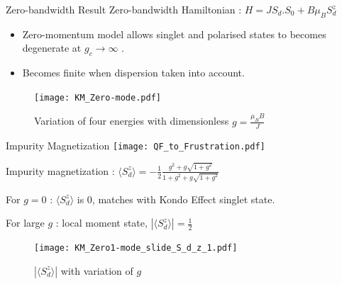 \documentclass{beamer}
\begin{document}
\begin{frame}{Zero-bandwidth Result}
Zero-bandwidth Hamiltonian : $H = J S_d. S_0 + B \mu_B S_d^z$
\begin{itemize}
\item Zero-momentum model allows singlet and polarised states to becomes degenerate at $g_c \to \infty$ . 
\item Becomes \alert{finite} when dispersion taken into account.
\end{itemize}
\begin{figure}[!ht]
    \centering
    \texttt{[image: KM\_Zero-mode.pdf]}
    \caption{Variation of four energies with dimensionless $g=\frac{\mu_B B}{J}$}
\end{figure}
\end{frame}

\begin{frame}{Impurity Magnetization {\hfill\texttt{[image: QF\_to\_Frustration.pdf]}\hfill}}

Impurity magnetization : 
 $\langle S_d^z \rangle = - \frac{1}{2}\frac{g^2 +g \sqrt{1+g^2}}{1+ g^2+ g\sqrt{1 + g^2}} $ \
 
 \begin{exampleblock}{For $g=0$ :}
         $\langle S_d^z \rangle$ is $0$, matches with Kondo Effect singlet state.
 \end{exampleblock}
 \begin{exampleblock}{For large $g$ :}
         local moment state, $|\langle S_d^z \rangle| =\frac{1}{2}$
 \end{exampleblock}


\begin{figure}[!ht]
    \centering
    \texttt{[image: KM\_Zero1-mode\_slide\_S\_d\_z\_1.pdf]}
    \caption{{\small $|\langle S_d^z \rangle|$  with variation of $g$}}
\end{figure}



\end{frame}
\end{document}
